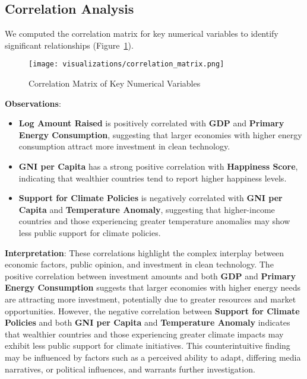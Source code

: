 \documentclass[sigconf]{acmart}
\begin{document}
\subsection{Correlation Analysis}

We computed the correlation matrix for key numerical variables to identify significant relationships (Figure~\ref{fig:correlation_matrix}). 

\begin{figure}[htpb]
    \centering
    \texttt{[image: visualizations/correlation\_matrix.png]}
    \caption{Correlation Matrix of Key Numerical Variables}
    \label{fig:correlation_matrix}
\end{figure}

\textbf{Observations}:

\begin{itemize}
    \item \textbf{Log Amount Raised} is positively correlated with \textbf{GDP} and \textbf{Primary Energy Consumption}, suggesting that larger economies with higher energy consumption attract more investment in clean technology.
    \item \textbf{GNI per Capita} has a strong positive correlation with \textbf{Happiness Score}, indicating that wealthier countries tend to report higher happiness levels.
    \item \textbf{Support for Climate Policies} is negatively correlated with \textbf{GNI per Capita} and \textbf{Temperature Anomaly}, suggesting that higher-income countries and those experiencing greater temperature anomalies may show less public support for climate policies.
\end{itemize}

\textbf{Interpretation}: These correlations highlight the complex interplay between economic factors, public opinion, and investment in clean technology. The positive correlation between investment amounts and both \textbf{GDP} and \textbf{Primary Energy Consumption} suggests that larger economies with higher energy needs are attracting more investment, potentially due to greater resources and market opportunities. However, the negative correlation between \textbf{Support for Climate Policies} and both \textbf{GNI per Capita} and \textbf{Temperature Anomaly} indicates that wealthier countries and those experiencing greater climate impacts may exhibit less public support for climate initiatives. This counterintuitive finding may be influenced by factors such as a perceived ability to adapt, differing media narratives, or political influences, and warrants further investigation.
\end{document}

